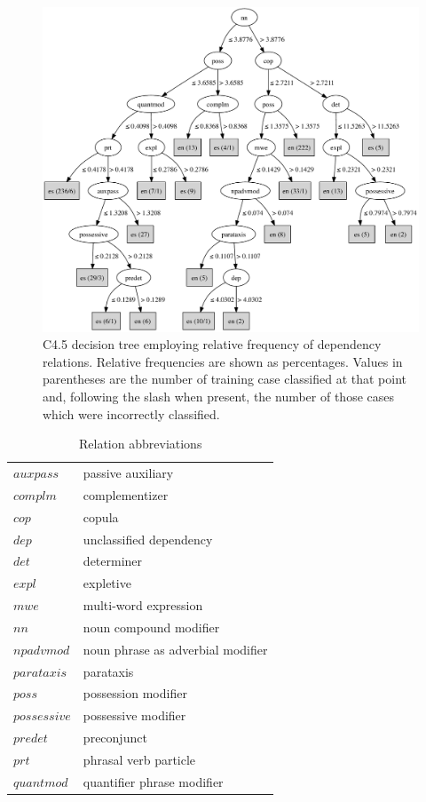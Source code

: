 \documentclass[main.tex]{subfiles}
\begin{document}
\begin{figure}[htbp]
\centering
\includegraphics[width=6in]{c45-dep-graph.pdf}
\caption{C4.5 decision tree employing relative frequency of dependency relations. Relative frequencies are shown as percentages. Values in parentheses are the number of training case classified at that point and, following the slash when present, the number of those cases which were incorrectly classified.}
\label{fig:c4.5-dep-tree}
\end{figure}

\begin{table}[ht]
\small
\centering
\caption{Relation abbreviations}
\begin{tabular}{ l  l }
    \toprule
$auxpass$ & passive auxiliary \\
$complm$ & complementizer \\
$cop$ & copula \\
$dep$ & unclassified dependency \\
$det$ & determiner \\
$expl$ & expletive\\
$mwe$ & multi-word expression \\
$nn$ & noun compound modifier \\
$npadvmod$ & noun phrase as adverbial modifier \\
$parataxis$ & parataxis \\
$poss$ & possession modifier \\
$possessive$ & possessive modifier \\
$predet$ & preconjunct \\
$prt$ & phrasal verb particle \\
$quantmod$ & quantifier phrase modifier \\
\bottomrule
\end{tabular}
\label{table:reln-abbr}
\end{table}
\end{document}
